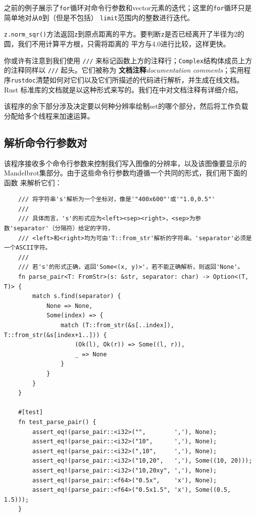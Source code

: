\smallskip
之前的例子展示了\texttt{for}循环对命令行参数和vector元素的迭代；这里的\texttt{for}循环只是简单地对从\texttt{0}到（但是不包括）
\texttt{limit}范围内的整数进行迭代。

\medskip
\texttt{z.norm\_sqr()}方法返回\texttt{z}到原点距离的平方。要判断\texttt{z}是否已经离开了半径为2的圆，我们不用计算平方根，只需将距离的
平方与4.0进行比较，这样更快。

\medskip
你或许有注意到我们使用 \texttt{///} 来标记函数上方的注释行；\texttt{Complex}结构体成员上方的注释同样以 \texttt{///} 起头。它们被称为
\textbf{文档注释}\textit{documentation comments}；实用程序\texttt{rustdoc}清楚如何对它们以及它们所描述的代码进行解析，并生成在线文档。Rust
标准库的文档就是以这种形式来写的。我们在中对文档注释有详细介绍。

\medskip
该程序的余下部分涉及决定要以何种分辨率绘制set的哪个部分，然后将工作负载分配给多个线程来加速运算。

\medskip
\subsection{解析命令行参数对}
该程序接收多个命令行参数来控制我们写入图像的分辨率，以及该图像要显示的Mandelbrot集部分。由于这些命令行参数均遵循一个共同的形式，我们用下面的函数
来解析它们：
\begin{verbatim}
    /// 将字符串's'解析为一个坐标对，像是'"400x600"'或'"1.0,0.5"'
    ///
    /// 具体而言，'s'的形式应为<left><sep><right>，<sep>为参数'separator'（分隔符）给定的字符，
    /// <left>和<right>均为可由'T::from_str'解析的字符串。'separator'必须是一个ASCII字符。
    /// 
    /// 若's'的形式正确，返回'Some<(x, y)>'，若不能正确解析，则返回'None'。
    fn parse_pair<T: FromStr>(s: &str, separator: char) -> Option<(T, T)> {
        match s.find(separator) {
            None => None,
            Some(index) => {
                match (T::from_str(&s[..index]), T::from_str(&s[index+1..])) {
                    (Ok(l), Ok(r)) => Some((l, r)),
                    _ => None
                }
            }
        }
    }

    #[test]
    fn test_parse_pair() {
        assert_eq!(parse_pair::<i32>("",        ','), None);
        assert_eq!(parse_pair::<i32>("10",      ','), None);
        assert_eq!(parse_pair::<i32>(",10",     ','), None);
        assert_eq!(parse_pair::<i32>("10,20",   ','), Some((10, 20)));
        assert_eq!(parse_pair::<i32>("10,20xy", ','), None);
        assert_eq!(parse_pair::<f64>("0.5x",    'x'), None);
        assert_eq!(parse_pair::<f64>("0.5x1.5", 'x'), Some((0.5, 1.5)));
    }
\end{verbatim}

